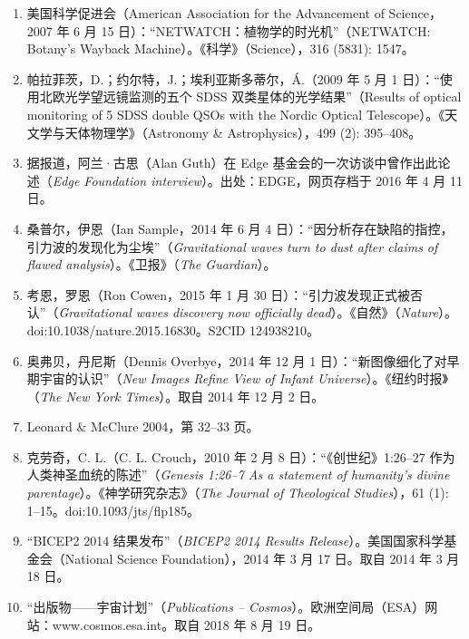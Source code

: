 \begin{enumerate}
\item 美国科学促进会（American Association for the Advancement of Science，2007 年 6 月 15 日）：“NETWATCH：植物学的时光机”（NETWATCH: Botany's Wayback Machine）。《科学》（Science），316 (5831): 1547。  
\item 帕拉菲茨，D.；约尔特，J.；埃利亚斯多蒂尔，Á.（2009 年 5 月 1 日）：“使用北欧光学望远镜监测的五个 SDSS 双类星体的光学结果”（Results of optical monitoring of 5 SDSS double QSOs with the Nordic Optical Telescope）。《天文学与天体物理学》（Astronomy & Astrophysics），499 (2): 395–408。
\item 据报道，阿兰·古思（Alan Guth）在 Edge 基金会的一次访谈中曾作出此论述（\emph{Edge Foundation interview}）。出处：EDGE，网页存档于 2016 年 4 月 11 日。  

\item 桑普尔，伊恩（Ian Sample，2014 年 6 月 4 日）：“因分析存在缺陷的指控，引力波的发现化为尘埃”（\emph{Gravitational waves turn to dust after claims of flawed analysis}）。《卫报》（\emph{The Guardian}）。  

\item 考恩，罗恩（Ron Cowen，2015 年 1 月 30 日）：“引力波发现正式被否认”（\emph{Gravitational waves discovery now officially dead}）。《自然》（\emph{Nature}）。doi:10.1038/nature.2015.16830。S2CID 124938210。  

\item 奥弗贝，丹尼斯（Dennis Overbye，2014 年 12 月 1 日）：“新图像细化了对早期宇宙的认识”（\emph{New Images Refine View of Infant Universe}）。《纽约时报》（\emph{The New York Times}）。取自 2014 年 12 月 2 日。  

\item Leonard & McClure 2004，第 32–33 页。  

\item 克劳奇，C. L.（C. L. Crouch，2010 年 2 月 8 日）：“《创世纪》1:26–27 作为人类神圣血统的陈述”（\emph{Genesis 1:26–7 As a statement of humanity's divine parentage}）。《神学研究杂志》（\emph{The Journal of Theological Studies}），61 (1): 1–15。doi:10.1093/jts/flp185。  

\item “BICEP2 2014 结果发布”（\emph{BICEP2 2014 Results Release}）。美国国家科学基金会（National Science Foundation），2014 年 3 月 17 日。取自 2014 年 3 月 18 日。  

\item “出版物——宇宙计划”（\emph{Publications – Cosmos}）。欧洲空间局（ESA）网站：www.cosmos.esa.int。取自 2018 年 8 月 19 日。  


\end{enumerate}
